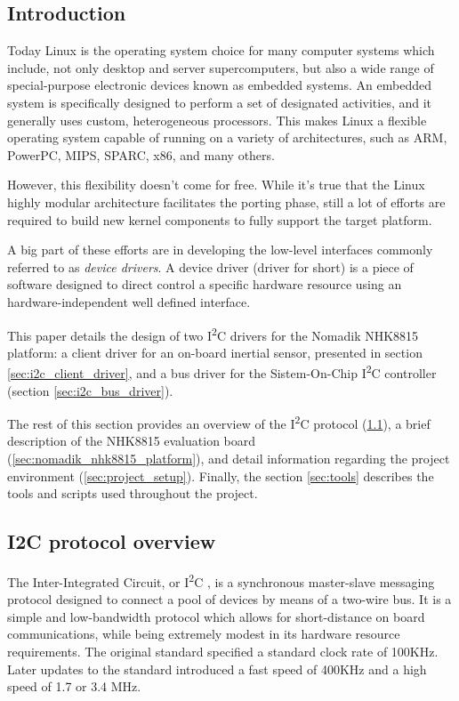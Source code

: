 \documentclass[a4paper,10pt]{article}
\newcommand{\iic}{I\textsuperscript{2}C }
\begin{document}
\vspace{4ex}	%
\begin{multicols}{2}

\section{Introduction}
Today Linux is the operating system choice for many computer systems which
include, not only desktop and server supercomputers, but also a wide range of 
special-purpose electronic devices known as embedded systems.
An embedded system is specifically designed to perform a set of designated
activities, and it generally uses custom, heterogeneous processors. This makes
Linux a flexible operating system capable of running on a variety of
architectures, such as ARM, PowerPC, MIPS, SPARC, x86, and many others.

However, this flexibility doesn't come for free. While it's true that the
Linux highly modular architecture facilitates the porting phase, still a
lot of efforts are required to build new kernel components to fully
support the target platform.

A big part of these efforts are in developing the low-level interfaces
commonly referred to as \emph{device drivers}.
A device driver (driver for short) is a piece of software designed to direct
control a specific hardware resource using an hardware-independent well defined
interface.

This paper details the design of two \iic drivers for the Nomadik NHK8815
platform: a client driver for an on-board inertial sensor, presented in
section \ref{sec:i2c_client_driver}, and a bus driver for the Sistem-On-Chip
\iic controller (section \ref{sec:i2c_bus_driver}).

The rest of this section provides an overview of the \iic protocol
(\ref{sec:i2c_protocol_overview}), a brief description of the NHK8815 evaluation
board (\ref{sec:nomadik_nhk8815_platform}), and detail information regarding
the project environment (\ref{sec:project_setup}). Finally, the section
\ref{sec:tools} describes the tools and scripts used throughout the project.



\subsection{I2C protocol overview}
\label{sec:i2c_protocol_overview}
The Inter-Integrated Circuit, or \iic, is a synchronous master-slave messaging
protocol designed to connect a pool of devices by means of a two-wire bus.
It is a simple and low-bandwidth protocol which allows for short-distance on
board communications, while being extremely modest in its hardware resource
requirements. The original standard specified a standard clock rate of 100KHz.
Later updates to the standard introduced a fast speed of 400KHz and a high speed
of 1.7 or 3.4 MHz.


\end{multicols}
\end{document}
